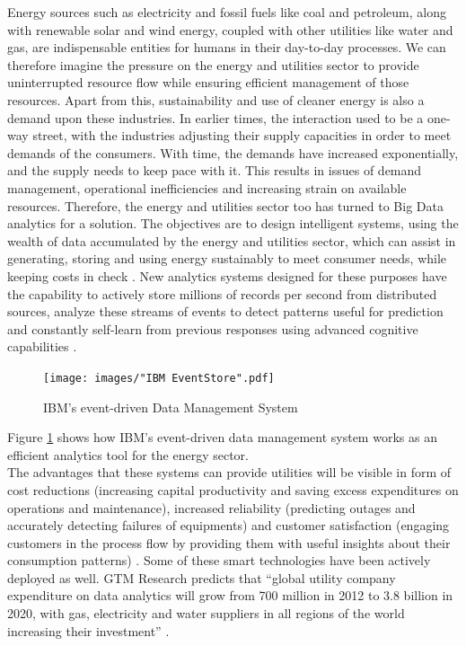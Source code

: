 Energy sources such as electricity and fossil fuels like coal and petroleum, along with renewable solar and wind energy, coupled with other utilities like water and gas, are indispensable entities for humans in their day-to-day processes. We can therefore imagine the pressure on the energy and utilities sector to provide uninterrupted resource flow while ensuring efficient management of those resources. Apart from this, sustainability and use of cleaner energy is also a demand upon these industries. In earlier times, the interaction used to be a one-way street, with the industries adjusting their supply capacities in order to meet demands of the consumers. With time, the demands have increased exponentially, and the supply needs to keep pace with it. This results in issues of demand management, operational inefficiencies and increasing strain on available resources. Therefore, the energy and utilities sector too has turned to Big Data analytics for a solution. The objectives are to design intelligent systems, using the wealth of data accumulated by the energy and utilities sector, which can assist in generating, storing and using energy sustainably to meet consumer needs, while keeping costs in check \cite{downey01}. New analytics systems designed for these purposes have the capability to actively store millions of records per second from  distributed sources, analyze these streams of events to detect patterns useful for prediction and constantly self-learn from previous responses using advanced cognitive capabilities \cite{downey01}.
\begin{figure}
	\texttt{[image: images/"IBM EventStore".pdf]}
	\caption{IBM's event-driven Data Management System \cite{downey01}}
	\label{F:event}
\end{figure}
Figure \ref{F:event} shows how IBM's event-driven data management system works as an efficient analytics tool for the energy sector.\\
The advantages that these systems can provide utilities will be visible in form of cost reductions (increasing capital productivity and saving excess expenditures on operations and maintenance), increased reliability (predicting outages and accurately detecting failures of equipments) and customer satisfaction (engaging customers in the process flow by providing them with useful insights about their consumption patterns) \cite{guille02}. Some of these smart technologies have been actively deployed as well. GTM Research predicts that ``global utility company expenditure on data analytics will grow from 700 million in 2012 to 3.8 billion in 2020, with gas, electricity and water suppliers in all regions of the world increasing their investment'' \cite{callahan03}.
   

